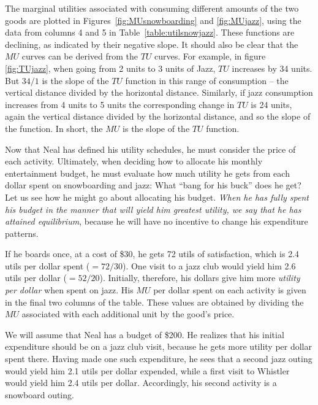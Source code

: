 







\newhtmlpage

The marginal utilities associated with consuming different amounts of the
two goods are plotted in Figures~\ref{fig:MUsnowboarding} and \ref{fig:MUjazz},
using the data from columns 4 and 5 in Table~\ref{table:utilsnowjazz}.
These functions are declining, as indicated by their
negative slope. It should also be clear that the $MU$ curves can be derived
from the $TU$ curves. For example, in figure \ref{fig:TUjazz}, when going
from 2 units to 3 units of Jazz, $TU$ increases by 34 units. But $34/1$ is
the slope of the $TU$ function in this range of consumption -- the vertical
distance divided by the horizontal distance. Similarly, if jazz consumption
increases from 4 units to 5 units the corresponding change in $TU$ is 24
units, again the vertical distance divided by the horizontal distance, and
so the slope of the function. In short, the $MU$ is the slope of the $TU$
function.

Now that Neal has defined his utility schedules, he must consider the price
of each activity. Ultimately, when deciding how to allocate his monthly
entertainment budget, he must evaluate how much utility he gets from each
dollar spent on snowboarding and jazz: What ``bang for his buck'' does he
get? Let us see how he might go about allocating his budget. \textit{When he
	has fully spent his budget in the manner that will yield him greatest
	utility, we say that he has attained equilibrium}, because he will have no
incentive to change his expenditure patterns.

If he boards once, at a cost of \$30, he gets 72 utils of satisfaction,
which is 2.4 utils per dollar spent ($=72/30$). One visit to a jazz club
would yield him 2.6 utils per dollar ($=52/20$). Initially, therefore, his
dollars give him more \textit{utility per dollar} when spent on jazz. His 
$MU$ per dollar spent on each activity is given in the final two columns of
the table. These values are obtained by dividing the $MU$ associated with
each additional unit by the good's price.

We will assume that Neal has a budget of \$200. He realizes that his initial
expenditure should be on a jazz club visit, because he gets more utility per
dollar spent there. Having made one such expenditure, he sees that a second jazz
outing would yield him 2.1 utils per dollar expended, while a first visit to
Whistler would yield him 2.4 utils per dollar. Accordingly, his second
activity is a snowboard outing.

